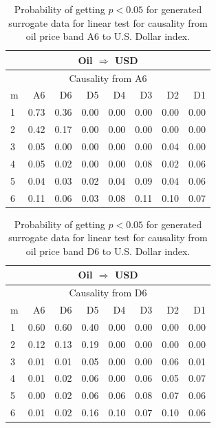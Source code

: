 %
%
\begin{table}[H]
\begin{center}
\begin{tabular}{l|r r r r r r r}
\hline\hline
\multicolumn{8}{c}{Oil $\Rightarrow$ USD}\\
\hline
\multicolumn{8}{c}{Causality from A6}\\
\hline\hline
m & A6 & D6 & D5 & D4 & D3 & D2 & D1 \\
\hline
1 & 0.73 & 0.36 & 0.00 & 0.00 & 0.00 & 0.00 & 0.00 \\
2 & 0.42 & 0.17 & 0.00 & 0.00 & 0.00 & 0.00 & 0.00 \\
3 & 0.05 & 0.00 & 0.00 & 0.00 & 0.00 & 0.04 & 0.00 \\
4 & 0.05 & 0.02 & 0.00 & 0.00 & 0.08 & 0.02 & 0.06 \\
5 & 0.04 & 0.03 & 0.02 & 0.04 & 0.09 & 0.04 & 0.06 \\
6 & 0.11 & 0.06 & 0.03 & 0.08 & 0.11 & 0.10 & 0.07 \\
\hline\hline
\end{tabular}
\caption{Probability of getting $p < 0.05$ for generated surrogate data for linear test for causality from oil price band A6 to U.S. Dollar index.}
\end{center}
\end{table}

%
%
\begin{table}[H]
\begin{center}
\begin{tabular}{l|r r r r r r r}
\hline\hline
\multicolumn{8}{c}{Oil $\Rightarrow$ USD}\\
\hline
\multicolumn{8}{c}{Causality from D6}\\
\hline\hline
m & A6 & D6 & D5 & D4 & D3 & D2 & D1 \\
\hline
1 & 0.60 & 0.60 & 0.40 & 0.00 & 0.00 & 0.00 & 0.00 \\
2 & 0.12 & 0.13 & 0.19 & 0.00 & 0.00 & 0.00 & 0.00 \\
3 & 0.01 & 0.01 & 0.05 & 0.00 & 0.00 & 0.06 & 0.01 \\
4 & 0.01 & 0.02 & 0.06 & 0.00 & 0.06 & 0.05 & 0.07 \\
5 & 0.00 & 0.02 & 0.06 & 0.06 & 0.08 & 0.07 & 0.06 \\
6 & 0.01 & 0.02 & 0.16 & 0.10 & 0.07 & 0.10 & 0.06 \\
\hline\hline
\end{tabular}
\caption{Probability of getting $p < 0.05$ for generated surrogate data for linear test for causality from oil price band D6 to U.S. Dollar index.}
\end{center}
\end{table}

